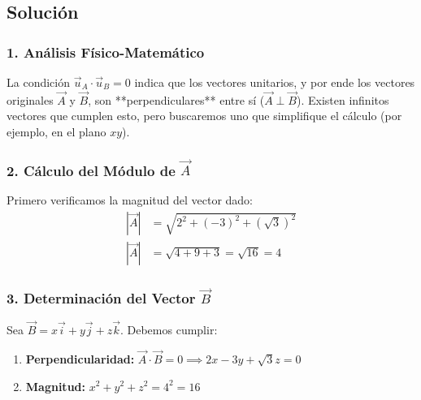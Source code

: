 \documentclass[12pt, a4paper]{article}
\begin{document}
\begin{center}
\end{center}

\subsection*{Solución}

\subsubsection*{1. Análisis Físico-Matemático}
La condición $\vec{u}_A \cdot \vec{u}_B = 0$ indica que los vectores unitarios, y por ende los vectores originales $\vec{A}$ y $\vec{B}$, son **perpendiculares** entre sí ($\vec{A} \perp \vec{B}$). Existen infinitos vectores que cumplen esto, pero buscaremos uno que simplifique el cálculo (por ejemplo, en el plano $xy$).

\subsubsection*{2. Cálculo del Módulo de $\vec{A}$}
Primero verificamos la magnitud del vector dado:
\begin{align*}
    |\vec{A}| &= \sqrt{2^2 + (-3)^2 + (\sqrt{3})^2} \\
    |\vec{A}| &= \sqrt{4 + 9 + 3} = \sqrt{16} = 4
\end{align*}

\subsubsection*{3. Determinación del Vector $\vec{B}$}
Sea $\vec{B} = x\vec{i} + y\vec{j} + z\vec{k}$. Debemos cumplir:
\begin{enumerate}
    \item \textbf{Perpendicularidad:} $\vec{A} \cdot \vec{B} = 0 \implies 2x - 3y + \sqrt{3}z = 0$
    \item \textbf{Magnitud:} $x^2 + y^2 + z^2 = 4^2 = 16$
\end{enumerate}
\end{document}
